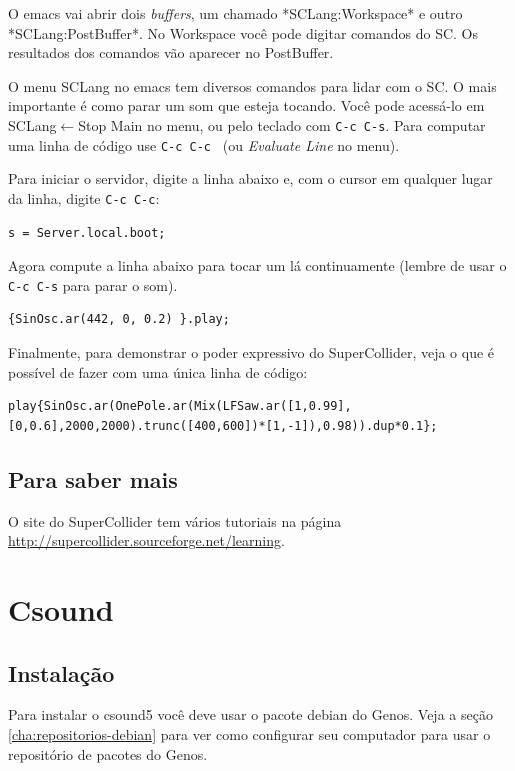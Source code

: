 \documentclass[12pt,brazil]{book}
\begin{document}
O emacs vai abrir dois \textit{buffers}, um chamado *SCLang:Workspace*
e outro *SCLang:PostBuffer*. No Workspace você pode digitar comandos
do SC. Os resultados dos comandos vão aparecer no PostBuffer.

O menu SCLang no emacs tem diversos comandos para lidar com o SC. O
mais importante é como parar um som que esteja tocando. Você pode
acessá-lo em SCLang$\leftarrow$Stop Main no menu, ou pelo teclado com
\texttt{C-c C-s}. Para computar uma linha de código use \texttt{C-c
  C-c } (ou \textit{Evaluate Line} no menu).

Para iniciar o servidor, digite a linha abaixo e, com o cursor em
qualquer lugar da linha, digite \texttt{C-c C-c}:

\begin{verbatim}
s = Server.local.boot;
\end{verbatim}

Agora compute a linha abaixo para tocar um lá continuamente (lembre de
usar o \texttt{C-c C-s} para parar o som).

\begin{verbatim}
{SinOsc.ar(442, 0, 0.2) }.play;
\end{verbatim}

Finalmente, para demonstrar o poder expressivo do SuperCollider, veja
o que é possível de fazer com uma única linha de código:

\begin{verbatim}
play{SinOsc.ar(OnePole.ar(Mix(LFSaw.ar([1,0.99],[0,0.6],2000,2000).trunc([400,600])*[1,-1]),0.98)).dup*0.1};
\end{verbatim}

\section{Para saber mais}
\label{sec:para-saber-mais-1}

O site do SuperCollider tem vários tutoriais na página
\url{http://supercollider.sourceforge.net/learning}.

\chapter{Csound}
\label{cha:csound}

\section{Instalação}
\label{sec:instalacao-4}

Para instalar o csound5 você deve usar o pacote debian do Genos. Veja
a seção \ref{cha:repositorios-debian} para ver como configurar seu
computador para usar o repositório de pacotes do Genos.
\end{document}
